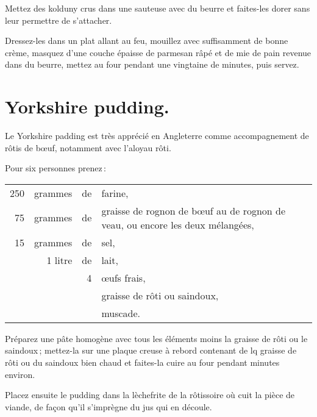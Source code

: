 Mettez des kolduny crus dans une sauteuse avec du beurre et faites-les dorer
sans leur permettre de s'attacher.

Dressez-les dans un plat allant au feu, mouillez avec suffisamment de bonne
crème, masquez d'une couche épaisse de parmesan râpé et de mie de pain revenue
dans du beurre, mettez au four pendant une vingtaine de minutes, puis servez.

\section*{\centering Yorkshire pudding.}
{}

Le Yorkshire padding est très apprécié en Angleterre comme accompagnement
de rôtis de bœuf, notamment avec l'aloyau rôti.

Pour six personnes prenez :

\footnotesize
\begin{longtable}{rrrp{16em}}
    250 & grammes & de & farine,                                                                          \\
     75 & grammes & de & graisse de rognon de bœuf au de rognon de veau, ou encore les deux mélangées,    \\
     15 & grammes & de & sel,                                                                             \\
        & 1 litre & de & lait,                                                                            \\
        &         &  4 & œufs frais,                                                                      \\
        &         &    & graisse de rôti ou saindoux,                                                     \\
        &         &    & muscade.                                                                         \\
\end{longtable}
\normalsize

Préparez une pâte homogène avec tous les éléments moins la graisse de rôti ou
le saindoux ; mettez-la sur une plaque creuse à rebord contenant de lq graisse
de rôti ou du saindoux bien chaud et faites-la cuire au four pendant
{\mmm} minutes environ.

Placez ensuite le pudding dans la lèchefrite de la rôtissoire où cuit la pièce
de viande, de façon qu'il s'imprègne du jus qui en découle.

